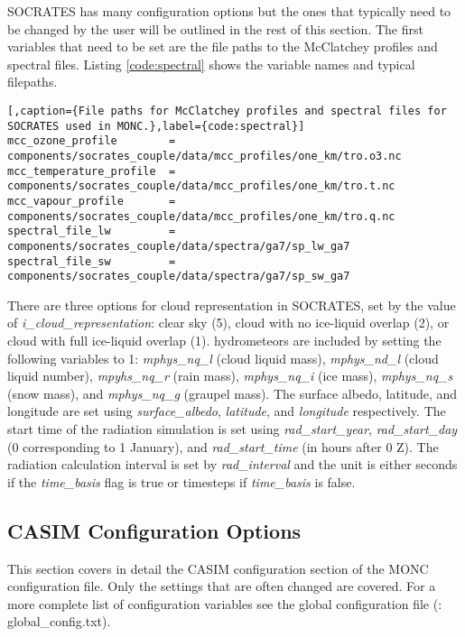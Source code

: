 SOCRATES has many configuration options but the ones that typically need to be changed by the user will be outlined in the rest of this section. The first variables that need to be set are the file paths to the McClatchey profiles and spectral files. Listing \ref{code:spectral} shows the variable names and typical filepaths. \citep{moncCode}
\newline
\begin{lstlisting}[,caption={File paths for McClatchey profiles and spectral files for SOCRATES used in MONC.},label={code:spectral}]
mcc_ozone_profile        = components/socrates_couple/data/mcc_profiles/one_km/tro.o3.nc
mcc_temperature_profile  = components/socrates_couple/data/mcc_profiles/one_km/tro.t.nc
mcc_vapour_profile       = components/socrates_couple/data/mcc_profiles/one_km/tro.q.nc
spectral_file_lw         = components/socrates_couple/data/spectra/ga7/sp_lw_ga7
spectral_file_sw         = components/socrates_couple/data/spectra/ga7/sp_sw_ga7	
\end{lstlisting}

There are three options for cloud representation in SOCRATES, set by the value of \textit{i\_cloud\_representation}: clear sky (5), cloud with no ice-liquid overlap (2), or cloud with full ice-liquid overlap (1). hydrometeors are included by setting the following variables to 1: \textit{mphys\_nq\_l} (cloud liquid mass), \textit{mphys\_nd\_l} (cloud liquid number), \textit{mpyhs\_nq\_r} (rain mass), \textit{mphys\_nq\_i} (ice mass), \textit{mphys\_nq\_s} (snow mass), and \textit{mphys\_nq\_g} (graupel mass). The surface albedo, latitude, and longitude are set using \textit{surface\_albedo}, \textit{latitude}, and \textit{longitude} respectively. The start time of the radiation simulation is set using \textit{rad\_start\_year}, \textit{rad\_start\_day} (0 corresponding to 1 January), and \textit{rad\_start\_time} (in hours after 0 Z). The radiation calculation interval is set by \textit{rad\_interval} and the unit is either seconds if the \textit{time\_basis} flag is true or timesteps if \textit{time\_basis} is false. \citep{moncCode}

\subsection{CASIM Configuration Options} \label{sec:mcf-cas}
This section covers in detail the CASIM configuration section of the MONC configuration file. Only the settings that are often changed are covered. For a more complete list of configuration variables see the global configuration file (\cite{moncCode}: global\_config.txt). 

